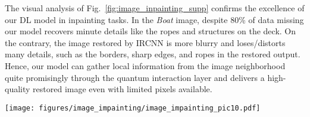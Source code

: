 \documentclass[10pt,journal,compsoc]{IEEEtran}
\begin{document}
The visual analysis of Fig.~\ref{fig:image_inpainting_supp} confirms the excellence of our DL model in inpainting tasks. In the \textit{Boat} image, despite 80\% of data missing our model recovers minute details like the ropes and structures on the deck. On the contrary, the image restored by IRCNN \cite{Zhang2017learning} is more blurry and loses/distorts many details, such as the borders, sharp edges, and ropes in the restored output. Hence, our model can gather local information from the image neighborhood quite promisingly through the quantum interaction layer and delivers a high-quality restored image even with limited pixels available.





\begin{figure*}[t!]
\begin{centering}
\texttt{[image: figures/image\_impainting/image\_impainting\_pic10.pdf]}
\end{centering}

\caption{Restored \textit{Boat} images, when 80\% pixels' are missing.}
\label{fig:image_inpainting_supp}

\end{figure*}
\end{document}
